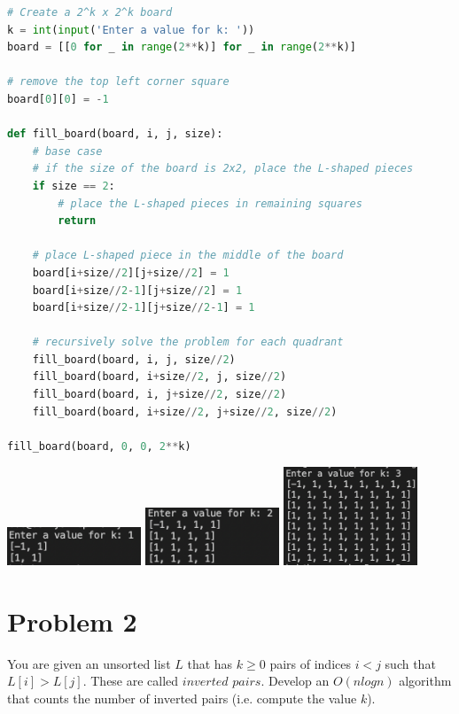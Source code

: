 \documentclass[12pt,letterpaper]{article}
\begin{document}
\begin{lstlisting}[language=Python]
# Create a 2^k x 2^k board
k = int(input('Enter a value for k: '))
board = [[0 for _ in range(2**k)] for _ in range(2**k)]

# remove the top left corner square
board[0][0] = -1

def fill_board(board, i, j, size):
    # base case
    # if the size of the board is 2x2, place the L-shaped pieces
    if size == 2:
        # place the L-shaped pieces in remaining squares
        return

    # place L-shaped piece in the middle of the board
    board[i+size//2][j+size//2] = 1
    board[i+size//2-1][j+size//2] = 1
    board[i+size//2-1][j+size//2-1] = 1

    # recursively solve the problem for each quadrant
    fill_board(board, i, j, size//2)
    fill_board(board, i+size//2, j, size//2)
    fill_board(board, i, j+size//2, size//2)
    fill_board(board, i+size//2, j+size//2, size//2)

fill_board(board, 0, 0, 2**k)

\end{lstlisting}


\includegraphics[width=0.3\textwidth]{images/1.code1.png}
\includegraphics[width=0.3\textwidth]{images/1.code2.png}
\includegraphics[width=0.3\textwidth]{images/1.code3.png}


\pagebreak

\section*{Problem 2}

You are given an unsorted list $L$ that has $k \ge 0$ pairs of indices $i < j$ such that $L[i] > L[j]$.
These are called $inverted$ $pairs$. Develop an $O(n log n)$ algorithm that counts the number of
inverted pairs (i.e. compute the value $k$).
\end{document}
